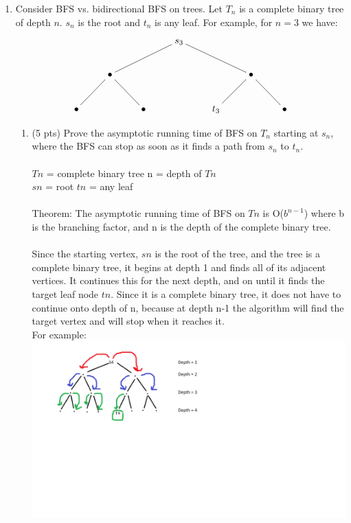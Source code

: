 \documentclass[12pt]{article}
\begin{document}
\begin{enumerate}
\begin{enumerate}
	\item \label{1d} Consider BFS vs. bidirectional BFS on trees. Let $T_n$ is a complete binary tree of depth $n$. $s_n$ is the root and $t_n$ is any leaf. For example, for $n=3$ we have:
	\[
	\xymatrix{
 	   & & & s_3 \ar@{-}[lld] \ar@{-}[rrd] \\ 
	  & \bullet \ar@{-}[dr] \ar@{-}[dl] & & & & \bullet \ar@{-}[dr] \ar@{-}[dl] \\
	\bullet & & \bullet & & t_3 & & \bullet
	}
	\]
	
	\begin{enumerate}
	\item (5 pts) Prove the asymptotic running time of BFS on $T_n$ starting at $s_n$, where the BFS can stop as soon as it finds a path from $s_n$ to $t_n$.\\
	\\$T{n}$ = complete binary tree \hspace*{10mm} n = depth of $T{n}$ \\$s{n}$ = root \hspace*{20mm} $t{n}$ = any leaf \\
	\\Theorem: The asymptotic running time of BFS on $T{n}$ is O($b^{n-1}$) where b is the branching factor, and n is the depth of the complete binary tree. \\
	\\ Since the starting vertex, $s{n}$ is the root of the tree, and the tree is a complete binary tree, it begins at depth 1 and finds all of its adjacent vertices. It continues this for the next depth, and on until it finds the target leaf node $t{n}$. Since it is a complete binary tree, it does not have to continue onto depth of n, because at depth n-1 the algorithm will find the target vertex and will stop when it reaches it.\\
	For example: \\
	\includegraphics[scale = 0.5]{bfstime.png}
		

\end{enumerate}
\end{enumerate}
\end{enumerate}
\end{document}
